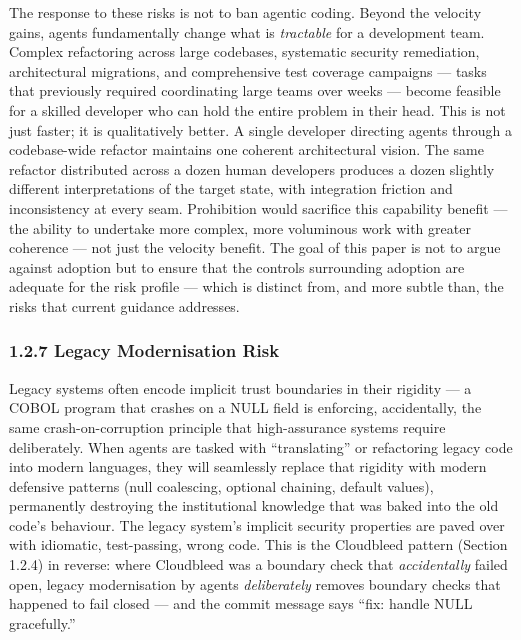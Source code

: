 \documentclass[a4paper,11pt]{report}
\begin{document}
The response to these risks is not to ban agentic coding. Beyond the
velocity gains, agents fundamentally change what is \emph{tractable} for
a development team. Complex refactoring across large codebases,
systematic security remediation, architectural migrations, and
comprehensive test coverage campaigns --- tasks that previously required
coordinating large teams over weeks --- become feasible for a skilled
developer who can hold the entire problem in their head. This is not
just faster; it is qualitatively better. A single developer directing
agents through a codebase-wide refactor maintains one coherent
architectural vision. The same refactor distributed across a dozen human
developers produces a dozen slightly different interpretations of the
target state, with integration friction and inconsistency at every seam.
Prohibition would sacrifice this capability benefit --- the ability to
undertake more complex, more voluminous work with greater coherence ---
not just the velocity benefit. The goal of this paper is not to argue
against adoption but to ensure that the controls surrounding adoption
are adequate for the risk profile --- which is distinct from, and more
subtle than, the risks that current guidance addresses.

\hypertarget{legacy-modernisation-risk}{%
\subsubsection{1.2.7 Legacy Modernisation
Risk}\label{legacy-modernisation-risk}}

Legacy systems often encode implicit trust boundaries in their rigidity
--- a COBOL program that crashes on a NULL field is enforcing,
accidentally, the same crash-on-corruption principle that high-assurance
systems require deliberately. When agents are tasked with
``translating'' or refactoring legacy code into modern languages, they
will seamlessly replace that rigidity with modern defensive patterns
(null coalescing, optional chaining, default values), permanently
destroying the institutional knowledge that was baked into the old
code's behaviour. The legacy system's implicit security properties are
paved over with idiomatic, test-passing, wrong code. This is the
Cloudbleed pattern (Section 1.2.4) in reverse: where Cloudbleed was a
boundary check that \emph{accidentally} failed open, legacy
modernisation by agents \emph{deliberately} removes boundary checks that
happened to fail closed --- and the commit message says ``fix: handle
NULL gracefully.''
\end{document}
